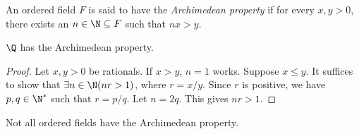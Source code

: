 \begin{definition*} \label{def:archimedean}
    An ordered field $F$ is said to have the \emph{Archimedean property} if
    for every $x, y > 0$, there exists an $n \in \N \subseteq F$ such that
    $nx > y$.
\end{definition*}

\begin{theorem*} \label{thm:Q:archimedean}
    $\Q$ has the Archimedean property.
\end{theorem*}
\begin{proof}
    Let $x, y > 0$ be rationals.
    If $x > y$, $n = 1$ works.
    Suppose $x \le y$.
    It suffices to show that $\exists n \in \N (nr > 1)$, where $r = x/y$.
    Since $r$ is positive, we have $p, q \in \N^*$ such that $r = p/q$.
    Let $n = 2q$.
    This gives $nr > 1$.
\end{proof}
\begin{remark}
    Not all ordered fields have the Archimedean property.
\end{remark}
